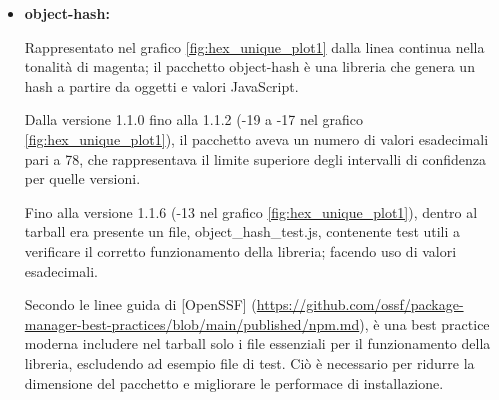 \begin{itemize}
\begin{itemize}
Per rendere il controllo dell'integrità dei dati veloce ed efficiente, l'algoritmo 
fa uso della tabella CRC: una matrice di 256 valori pre-calcolati che evita al processore di 
eseguire calcoli matematici complessi su ogni singolo byte.

Fino alla versione 0.2.13 (-9 nel grafico \ref{fig:hex_unique_plot1}), 
il pacchetto aveva 256 valori esadecimali unici, rappresentanti i valori della tabella CRC.

Dalla versione 1.0.0-RC1 (-8 nel grafico \ref{fig:hex_unique_plot1}), gli sviluppatori hanno deciso 
di ottimizzare lo spazio del pacchetto,
distribuendo nel tarball il file contenente la tabella crc generato, usando 
strumenti di build automatici quali bundler e minificatori.
In questo processo automatico, 
gli strumenti di build scelgono spesso il formato decimale perché più compatto;
motivo per cui sono stati convertiti i valori della tabella da esadecimali in decimali,
lasciando però invariato il valore matematico.

        \item \textbf{object-hash:}

Rappresentato nel grafico \ref{fig:hex_unique_plot1} dalla linea continua nella tonalità di magenta;
il pacchetto object-hash è una libreria che 
genera un hash a partire da oggetti e valori JavaScript.

Dalla versione 1.1.0 fino alla 1.1.2 (-19 a -17 nel grafico \ref{fig:hex_unique_plot1}),
il pacchetto aveva un numero di valori esadecimali pari a 78, che rappresentava 
il limite superiore degli intervalli di confidenza per quelle versioni.

Fino alla versione 1.1.6 (-13 nel grafico \ref{fig:hex_unique_plot1}), 
dentro al tarball era presente un file, object\_hash\_test.js, 
contenente test utili a verificare il corretto 
funzionamento della libreria; facendo uso di valori esadecimali.

Secondo le linee guida di [OpenSSF] (\url{https://github.com/ossf/package-manager-best-practices/blob/main/published/npm.md}),
è una best practice moderna includere nel tarball solo i file essenziali per il funzionamento della libreria,
escludendo ad esempio file di test.
Ciò è necessario per ridurre la dimensione del pacchetto e 
migliorare le performace di installazione.


\end{itemize}
\end{itemize}
